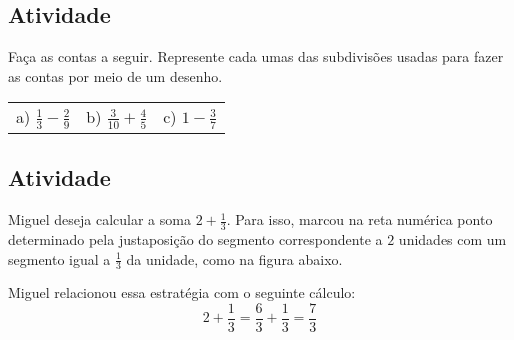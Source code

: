 \documentclass[a4,12pt]{book}
\begin{document}
\subsection{Atividade}

Faça as contas a seguir. Represente cada umas das subdivisões usadas para fazer as contas por meio de um desenho.

\begin{center}
  \begin{tabular}{m{}m{}m{}}    
     a) $\frac{1}{3} - \frac{2}{9}$  &   b) $\frac{3}{10} + \frac{4}{5}$  &   c) $1 - \frac{3}{7}$     
  \end{tabular}
\end{center}

\subsection{Atividade}
Miguel deseja calcular a soma $2 + \frac{1}{3}$. Para isso, marcou na reta numérica ponto determinado pela justaposição do segmento correspondente a $2$ unidades com um segmento igual a $\frac{1}{3}$ da unidade, como na figura abaixo. 

Miguel relacionou essa estratégia com o seguinte cálculo: 
$$ 2 + \frac{1}{3} =  \frac{6}{3} + \frac{1}{3} = \frac{7}{3}$$

% 
\end{document}

